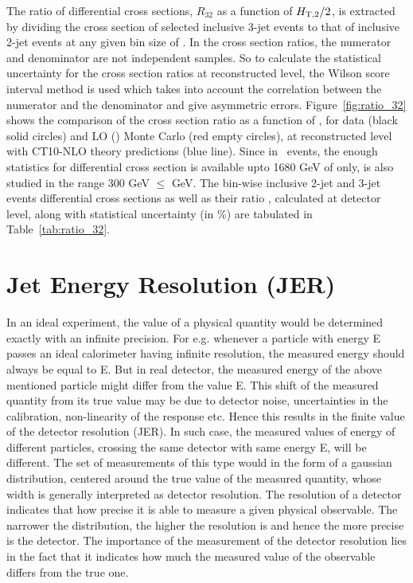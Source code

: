 The ratio of differential cross sections, $R_{32}$ as a function of $H_{\mathrm{T,2}}/2$, is extracted by dividing the cross section of selected inclusive 3-jet events to that of inclusive 2-jet events at any given bin size of \httwo. In the cross section ratios, the numerator and denominator are not independent samples. So to calculate the statistical uncertainty for the cross section ratios at reconstructed level, the Wilson score interval method is used which takes into account the correlation between the numerator and the denominator and give asymmetric errors. Figure~\ref{fig:ratio_32} shows the comparison of the cross section ratio \ratio as a function of \httwons, for data (black solid circles) and LO \MadGraphF \plus \PYTHIAS (\MGP) Monte Carlo (red empty circles), at reconstructed level with CT10-NLO theory predictions (blue line). Since in \njth~events, the enough statistics for differential cross section is available upto 1680 GeV of \httwo only, \ratio is also studied in the range 300 GeV $\leq$ \httwo {} GeV. The bin-wise inclusive 2-jet and 3-jet events differential cross sections as well as their ratio \ratio, calculated at detector level, along with statistical uncertainty (in \%) are tabulated in Table~\ref{tab:ratio_32}. 

\section{Jet Energy Resolution (JER)}
\label{sec:Resolution}
In an ideal experiment, the value of a physical quantity would be determined exactly with an infinite precision. For e.g. whenever a particle with energy E passes an ideal calorimeter having infinite resolution, the measured energy should always be equal to E. But in real detector, the measured energy of the above mentioned particle might differ from the value E. This shift of the measured quantity from its true value may be due to detector noise, uncertainties in the calibration, non-linearity of the response etc. Hence this results in the finite value of the detector resolution (JER). In such case, the measured values of energy of different particles, crossing the same detector with same energy E, will be different. The set of measurements of this type would in the form of a gaussian distribution, centered around the true value of the measured quantity, whose width is generally interpreted as detector resolution. The resolution of a detector indicates that how precise it is able to measure a given physical observable. The narrower the distribution, the higher the resolution is and hence the more precise is the detector. The importance of the measurement of the detector resolution lies in the fact that it indicates how much the measured value of the observable differs from the true one. %

